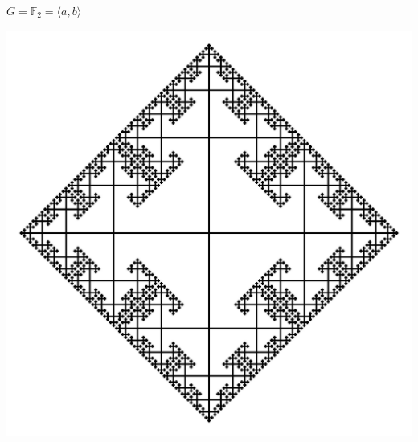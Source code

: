 

\begin{frame}{$G=\mathbb F_2 = \langle a,b\rangle$}
\begin{center}
\vfill
\includegraphics[width=0.8\linewidth]{Cayley_2}
\vfill
\end{center}
\end{frame}


